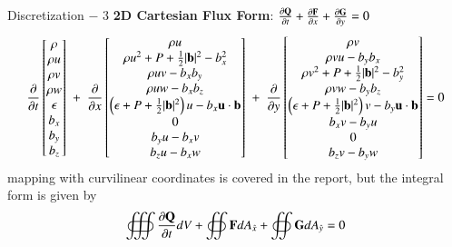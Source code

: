 \begin{frame}[t]{Discretization $-$ 3}
  \textbf{2D Cartesian Flux Form}: $\frac{\partial \mathbf{Q}}{\partial t} + \frac{\partial \mathbf{F}}{\partial x} + \frac{\partial \mathbf{G}}{\partial y} = 0$ 
\[
  \frac{\partial }{\partial t}
  \begin{bmatrix}
    \rho  \\
    \rho u  \\
    \rho v \\
    \rho w \\
    \epsilon\\
    b_x \\
    b_y \\
    b_z 
  \end{bmatrix}
  \;+\;\frac{\partial }{\partial x}
  \begin{bmatrix}
    \rho u  \\
    \rho u^2 + P + \frac{1}{2}|\mathbf{b}|^2 - b_x^2\\
    \rho u v - b_x b_y \\
    \rho u w - b_x b_z \\
    \left(\epsilon+ P + \frac{1}{2}|\mathbf{b}|^2 \right) u - b_x \mathbf{u}\cdot\mathbf{b}\\
    0 \\
    b_y u - b_x v \\
    b_z u - b_x w 
  \end{bmatrix}
  \;+\;\frac{\partial }{\partial y}
  \begin{bmatrix}
    \rho v  \\
    \rho v u - b_y b_x\\
    \rho v^2 + P + \frac{1}{2}|\mathbf{b}|^2 - b_y^2\\
    \rho v w - b_y b_z \\
    \left(\epsilon+ P + \frac{1}{2}|\mathbf{b}|^2  \right) v - b_y\mathbf{u}\cdot\mathbf{b}\\
    b_x v - b_y u \\
    0 \\
    b_z v - b_y w 
  \end{bmatrix}
  =0
\]
mapping with curvilinear coordinates is covered in the report, but the integral form is given by
\begin{equation*}
  \oiiint \pfrac{\mathbf{Q}}{t} dV + \oiint \mathbf F dA_{\hat{x}}  + \oiint \mathbf G dA_{\hat{y}}  = 0
\end{equation*}
\end{frame}

